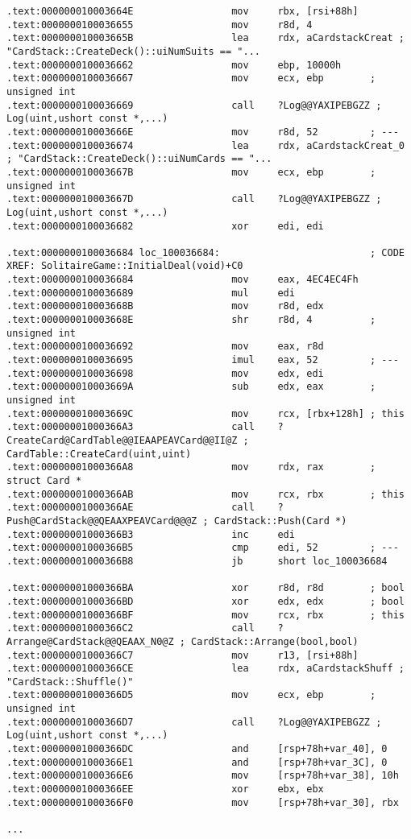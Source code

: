 \begin{lstlisting}
.text:000000010003664E                 mov     rbx, [rsi+88h]
.text:0000000100036655                 mov     r8d, 4
.text:000000010003665B                 lea     rdx, aCardstackCreat ; "CardStack::CreateDeck()::uiNumSuits == "...
.text:0000000100036662                 mov     ebp, 10000h
.text:0000000100036667                 mov     ecx, ebp        ; unsigned int
.text:0000000100036669                 call    ?Log@@YAXIPEBGZZ ; Log(uint,ushort const *,...)
.text:000000010003666E                 mov     r8d, 52         ; ---
.text:0000000100036674                 lea     rdx, aCardstackCreat_0 ; "CardStack::CreateDeck()::uiNumCards == "...
.text:000000010003667B                 mov     ecx, ebp        ; unsigned int
.text:000000010003667D                 call    ?Log@@YAXIPEBGZZ ; Log(uint,ushort const *,...)
.text:0000000100036682                 xor     edi, edi

.text:0000000100036684 loc_100036684:                          ; CODE XREF: SolitaireGame::InitialDeal(void)+C0
.text:0000000100036684                 mov     eax, 4EC4EC4Fh
.text:0000000100036689                 mul     edi
.text:000000010003668B                 mov     r8d, edx
.text:000000010003668E                 shr     r8d, 4          ; unsigned int
.text:0000000100036692                 mov     eax, r8d
.text:0000000100036695                 imul    eax, 52         ; ---
.text:0000000100036698                 mov     edx, edi
.text:000000010003669A                 sub     edx, eax        ; unsigned int
.text:000000010003669C                 mov     rcx, [rbx+128h] ; this
.text:00000001000366A3                 call    ?CreateCard@CardTable@@IEAAPEAVCard@@II@Z ; CardTable::CreateCard(uint,uint)
.text:00000001000366A8                 mov     rdx, rax        ; struct Card *
.text:00000001000366AB                 mov     rcx, rbx        ; this
.text:00000001000366AE                 call    ?Push@CardStack@@QEAAXPEAVCard@@@Z ; CardStack::Push(Card *)
.text:00000001000366B3                 inc     edi
.text:00000001000366B5                 cmp     edi, 52         ; ---
.text:00000001000366B8                 jb      short loc_100036684

.text:00000001000366BA                 xor     r8d, r8d        ; bool
.text:00000001000366BD                 xor     edx, edx        ; bool
.text:00000001000366BF                 mov     rcx, rbx        ; this
.text:00000001000366C2                 call    ?Arrange@CardStack@@QEAAX_N0@Z ; CardStack::Arrange(bool,bool)
.text:00000001000366C7                 mov     r13, [rsi+88h]
.text:00000001000366CE                 lea     rdx, aCardstackShuff ; "CardStack::Shuffle()"
.text:00000001000366D5                 mov     ecx, ebp        ; unsigned int
.text:00000001000366D7                 call    ?Log@@YAXIPEBGZZ ; Log(uint,ushort const *,...)
.text:00000001000366DC                 and     [rsp+78h+var_40], 0
.text:00000001000366E1                 and     [rsp+78h+var_3C], 0
.text:00000001000366E6                 mov     [rsp+78h+var_38], 10h
.text:00000001000366EE                 xor     ebx, ebx
.text:00000001000366F0                 mov     [rsp+78h+var_30], rbx

...
\end{lstlisting}

